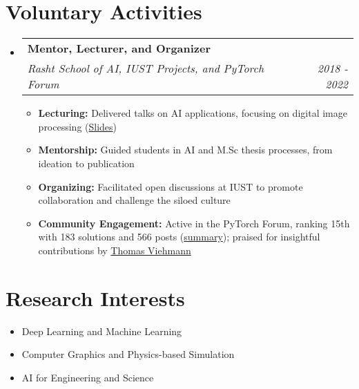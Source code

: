 \documentclass[letterpaper,11pt]{article}
\makeatletter
\newcommand{\resumeItem}[1]{
  \item\small{
    {#1 \vspace{-2pt}}
  }
}
\newcommand{\resumeSubheading}[5]{
  \item
    \begin{tabular*}{0.97\textwidth}{l@{\extracolsep{\fill}}r}
      \textbf{#1} & #2 \\ 
      \textit{\small#3} & \textit{\small #4} \\
      \textit{#5} & 
    \end{tabular*}\vspace{-5pt}
}
\newcommand{\resumeSubheadingF}[4]{
  \item
    \begin{tabular*}{0.97\textwidth}{l@{\extracolsep{\fill}}r}
      \textbf{#1} & #2 \\ 
      \textit{\small#3} & \textit{\small #4} \\
    \end{tabular*}\vspace{-5pt}
}
\newcommand{\resumeSubHeadingListStart}{\begin{itemize}[leftmargin=*]}
\newcommand{\resumeSubHeadingListEnd}{\end{itemize}}
\newcommand{\resumeItemListStart}{\begin{itemize}}
\newcommand{\resumeItemListEnd}{\end{itemize}\vspace{-5pt}}
\makeatother
\begin{document}

\section{Voluntary Activities}
\resumeSubHeadingListStart
  \resumeSubheadingF
    {Mentor, Lecturer, and Organizer}{}
    {Rasht School of AI, IUST Projects, and PyTorch Forum}{2018 - 2022}
    \resumeItemListStart
      \resumeItem{\textbf{Lecturing:} Delivered talks on AI applications, focusing on digital image processing (\href{https://github.com/rasht-school-of-ai/Meetup-Materials}{Slides})}
      \resumeItem{\textbf{Mentorship:} Guided students in AI and M.Sc thesis processes, from ideation to publication}
      \resumeItem{\textbf{Organizing:} Facilitated open discussions at IUST to promote collaboration and challenge the siloed culture}
      \resumeItem{\textbf{Community Engagement:} Active in the PyTorch Forum, ranking 15th with 183 solutions and 566 posts (\href{https://discuss.pytorch.org/u/Nikronic/}{summary}); praised for insightful contributions by \href{https://twitter.com/ThomasViehmann/status/1309794697049714689}{Thomas Viehmann}}
    \resumeItemListEnd
\resumeSubHeadingListEnd

\section{Research Interests}
  \resumeSubHeadingListStart
    \resumeItem{Deep Learning and Machine Learning}
    \vspace{-5pt}
    \resumeItem{Computer Graphics and Physics-based Simulation} 
    \vspace{-5pt}
    \resumeItem{AI for Engineering and Science}
  \resumeSubHeadingListEnd
\end{document}
